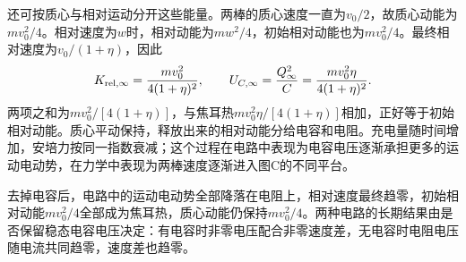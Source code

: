 \documentclass[UTF8,fontset=fandol,a4paper,11pt]{ctexart}
\begin{document}
还可按质心与相对运动分开这些能量。两棒的质心速度一直为$v_0/2$，故质心动能为$mv_0^2/4$。相对速度为$w$时，相对动能为$mw^2/4$，初始相对动能也为$mv_0^2/4$。最终相对速度为$v_0/(1+\eta)$，因此
\[
K_{\rm rel,\infty}=\frac{mv_0^2}{4(1+\eta)^2},\qquad
U_{C,\infty}=\frac{Q_\infty^2}{C}
=\frac{mv_0^2\eta}{4(1+\eta)^2}.
\]
两项之和为$mv_0^2/[4(1+\eta)]$，与焦耳热$mv_0^2\eta/[4(1+\eta)]$相加，正好等于初始相对动能。质心平动保持，释放出来的相对动能分给电容和电阻。充电量随时间增加，安培力按同一指数衰减；这个过程在电路中表现为电容电压逐渐承担更多的运动电动势，在力学中表现为两棒速度逐渐进入图C的不同平台。

去掉电容后，电路中的运动电动势全部降落在电阻上，相对速度最终趋零，初始相对动能$mv_0^2/4$全部成为焦耳热，质心动能仍保持$mv_0^2/4$。两种电路的长期结果由是否保留稳态电容电压决定：有电容时非零电压配合非零速度差，无电容时电阻电压随电流共同趋零，速度差也趋零。
\end{document}
